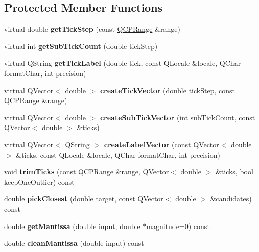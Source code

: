 \subsection*{Protected Member Functions}
\begin{DoxyCompactItemize}
\item 
\mbox{\label{class_q_c_p_axis_ticker_a910d69bcec2de37e92d8d4e1ecf201e2}} 
virtual double {\bfseries get\+Tick\+Step} (const \hyperlink{class_q_c_p_range}{Q\+C\+P\+Range} \&range)
\item 
\mbox{\label{class_q_c_p_axis_ticker_a4ccc403ced7a1457ce6ba293509933c8}} 
virtual int {\bfseries get\+Sub\+Tick\+Count} (double tick\+Step)
\item 
\mbox{\label{class_q_c_p_axis_ticker_a8201eb4aa8be192bf786b126eb5ee089}} 
virtual Q\+String {\bfseries get\+Tick\+Label} (double tick, const Q\+Locale \&locale, Q\+Char format\+Char, int precision)
\item 
\mbox{\label{class_q_c_p_axis_ticker_af4645a824c7bd2ca8fc7e86ebf9055bd}} 
virtual Q\+Vector$<$ double $>$ {\bfseries create\+Tick\+Vector} (double tick\+Step, const \hyperlink{class_q_c_p_range}{Q\+C\+P\+Range} \&range)
\item 
\mbox{\label{class_q_c_p_axis_ticker_a9a6435723fa0bd366d1ea4c2cff7c33f}} 
virtual Q\+Vector$<$ double $>$ {\bfseries create\+Sub\+Tick\+Vector} (int sub\+Tick\+Count, const Q\+Vector$<$ double $>$ \&ticks)
\item 
\mbox{\label{class_q_c_p_axis_ticker_a804050e408f37a0b9770c6654ebe6aa7}} 
virtual Q\+Vector$<$ Q\+String $>$ {\bfseries create\+Label\+Vector} (const Q\+Vector$<$ double $>$ \&ticks, const Q\+Locale \&locale, Q\+Char format\+Char, int precision)
\item 
\mbox{\label{class_q_c_p_axis_ticker_ab28cc1ab549489be7975f5ce7e717916}} 
void {\bfseries trim\+Ticks} (const \hyperlink{class_q_c_p_range}{Q\+C\+P\+Range} \&range, Q\+Vector$<$ double $>$ \&ticks, bool keep\+One\+Outlier) const
\item 
\mbox{\label{class_q_c_p_axis_ticker_a4ea0a7c4ca1c610f92b9bd5944ab4260}} 
double {\bfseries pick\+Closest} (double target, const Q\+Vector$<$ double $>$ \&candidates) const
\item 
\mbox{\label{class_q_c_p_axis_ticker_a2f1e223bafbf2cec7c3ba8b08d5c77e8}} 
double {\bfseries get\+Mantissa} (double input, double $\ast$magnitude=0) const
\item 
\mbox{\label{class_q_c_p_axis_ticker_ac7df6c72876b7abd67c932663a0b0f6a}} 
double {\bfseries clean\+Mantissa} (double input) const
\end{DoxyCompactItemize}
